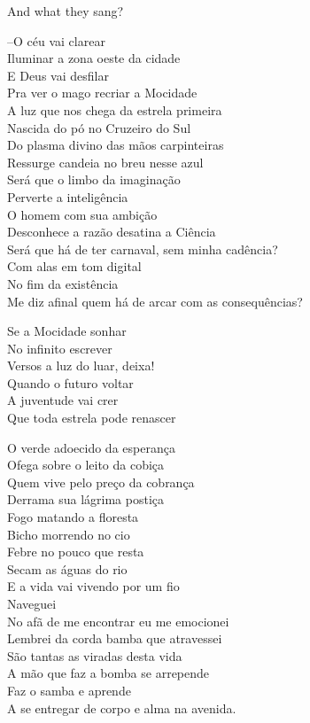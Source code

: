 \secdiv

And what they sang?

--O céu vai clarear \\
Iluminar a zona oeste da cidade \\
E Deus vai desfilar \\
Pra ver o mago recriar a Mocidade \\

A luz que nos chega da estrela primeira \\
Nascida do pó no Cruzeiro do Sul \\
Do plasma divino das mãos carpinteiras \\
Ressurge candeia no breu nesse azul \\
Será que o limbo da imaginação \\
Perverte a inteligência \\
O homem com sua ambição \\
Desconhece a razão desatina a Ciência \\
Será que há de ter carnaval, sem minha cadência? \\
Com alas em tom digital \\
No fim da existência \\
Me diz afinal quem há de arcar com as consequências?

Se a Mocidade sonhar \\
No infinito escrever \\
Versos a luz do luar, deixa! \\
Quando o futuro voltar \\
A juventude vai crer \\
Que toda estrela pode renascer

O verde adoecido da esperança \\
Ofega sobre o leito da cobiça \\
Quem vive pelo preço da cobrança \\
Derrama sua lágrima postiça \\
Fogo matando a floresta \\
Bicho morrendo no cio \\
Febre no pouco que resta \\
Secam as águas do rio \\
E a vida vai vivendo por um fio \\
Naveguei \\
No afã de me encontrar eu me emocionei \\
Lembrei da corda bamba que atravessei \\
São tantas as viradas desta vida \\
A mão que faz a bomba se arrepende \\
Faz o samba e aprende \\
A se entregar de corpo e alma na avenida.